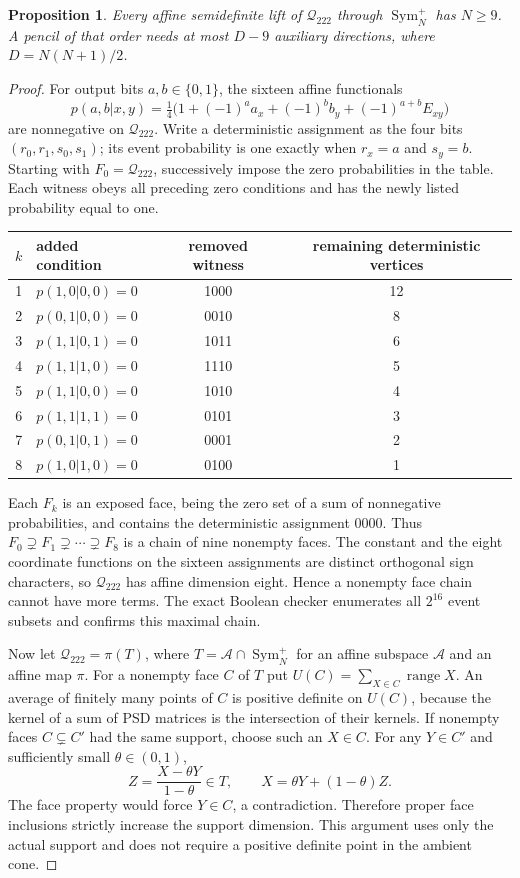 \documentclass[11pt]{article}
\newcommand{\Q}{\mathcal Q_{222}}
\newtheorem{proposition}[theorem]{Proposition}
\begin{document}
\begin{proposition}\label{prop:size-bound}
Every affine semidefinite lift of $\Q$ through $\operatorname{Sym}_N^+$
has $N\geq9$. A pencil of that order needs at most $D-9$ auxiliary
directions, where $D=N(N+1)/2$.
\end{proposition}
\begin{proof}
For output bits $a,b\in\{0,1\}$, the sixteen affine functionals
\[
 p(a,b|x,y)=\tfrac14\bigl(1+(-1)^a a_x+(-1)^b b_y
                                  +(-1)^{a+b}E_{xy}\bigr)
\]
are nonnegative on $\Q$. Write a deterministic assignment as the four
bits $(r_0,r_1,s_0,s_1)$; its event probability is one exactly when
$r_x=a$ and $s_y=b$. Starting with $F_0=\Q$, successively impose the
zero probabilities in the table. Each witness obeys all preceding zero
conditions and has the newly listed probability equal to one.
\begin{center}
\begin{tabular}{clcc}
\toprule
$k$&added condition&removed witness&remaining deterministic vertices\\
\midrule
1&$p(1,0|0,0)=0$&1000&12\\
2&$p(0,1|0,0)=0$&0010&8\\
3&$p(1,1|0,1)=0$&1011&6\\
4&$p(1,1|1,0)=0$&1110&5\\
5&$p(1,1|0,0)=0$&1010&4\\
6&$p(1,1|1,1)=0$&0101&3\\
7&$p(0,1|0,1)=0$&0001&2\\
8&$p(1,0|1,0)=0$&0100&1\\
\bottomrule
\end{tabular}
\end{center}
Each $F_k$ is an exposed face, being the zero set of a sum of
nonnegative probabilities, and contains the deterministic assignment
0000. Thus $F_0\supsetneq F_1\supsetneq\cdots\supsetneq F_8$ is a
chain of nine nonempty faces. The constant and the eight coordinate
functions on the sixteen assignments are distinct orthogonal sign
characters, so $\Q$ has affine dimension eight. Hence a nonempty face
chain cannot have more terms. The exact Boolean checker enumerates all
$2^{16}$ event subsets and confirms this maximal chain.

Now let $\Q=\pi(T)$, where
$T=\mathcal A\cap\operatorname{Sym}_N^+$ for an affine subspace
$\mathcal A$ and an affine map $\pi$. For a nonempty face $C$ of $T$ put
$U(C)=\sum_{X\in C}\operatorname{range}X$. An average of finitely many
points of $C$ is positive definite on $U(C)$, because the kernel of a
sum of PSD matrices is the intersection of their kernels. If nonempty
faces $C\subsetneq C'$ had the same support, choose such an $X\in C$.
For any $Y\in C'$ and sufficiently small $\theta\in(0,1)$,
\[
 Z=\frac{X-\theta Y}{1-\theta}\in T,\qquad
 X=\theta Y+(1-\theta)Z.
\]
The face property would force $Y\in C$, a contradiction. Therefore
proper face inclusions strictly increase the support dimension. This
argument uses only the actual support and does not require a positive
definite point in the ambient cone.


\end{proof}
\end{document}
